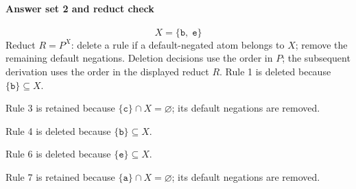 \documentclass[a4paper,11pt]{article}
\newcommand{\at}[1]{\texttt{#1}}
\begin{document}
\paragraph{Answer set 2 and reduct check}
\[
X=\{\at{b},\;\at{e}\}
\]
Reduct $R=P^X$: delete a rule if a default-negated atom belongs to $X$; remove the remaining default negations. Deletion decisions use the order in $P$; the subsequent derivation uses the order in the displayed reduct $R$.
Rule 1 is deleted because $\{\at{b}\}\subseteq X$.

Rule 3 is retained because $\{\at{c}\}\cap X=\varnothing$; its default negations are removed.

Rule 4 is deleted because $\{\at{b}\}\subseteq X$.

Rule 6 is deleted because $\{\at{e}\}\subseteq X$.

Rule 7 is retained because $\{\at{a}\}\cap X=\varnothing$; its default negations are removed.
\end{document}

